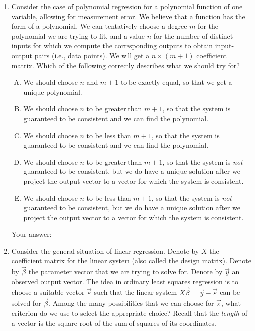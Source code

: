\documentclass[10pt]{amsart}
\begin{document}
\begin{enumerate}
\item Consider the case of polynomial regression for a polynomial
  function of one variable, allowing for measurement error. We believe
  that a function has the form of a polynomial. We can tentatively
  choose a degree $m$ for the polynomial we are trying to fit, and a
  value $n$ for the number of distinct inputs for which we compute the
  corresponding outputs to obtain input-output pairs (i.e., data
  points). We will get a $n \times (m + 1)$ coefficient matrix. Which
  of the following correctly describes what we should try for?

  \begin{enumerate}[(A)]
  \item We should choose $n$ and $m + 1$ to be exactly equal, so that
    we get a unique polynomial.
  \item We should choose $n$ to be greater than $m + 1$, so that the
    system is guaranteed to be consistent and we can find the
    polynomial.
  \item We should choose $n$ to be less than $m + 1$, so that the
    system is guaranteed to be consistent and we can find the polynomial.
  \item We should choose $n$ to be greater than $m + 1$, so that the
    system is {\em not} guaranteed to be consistent, but we do have a
    unique solution after we project the output vector to a vector for
    which the system is consistent.
  \item We should choose $n$ to be less than $m + 1$, so that the
    system is {\em not} guaranteed to be consistent, but we do have a
    unique solution after we project the output vector to a vector for
    which the system is consistent.
  \end{enumerate}

  \vspace{0.1in}
  Your answer: $\underline{\qquad\qquad\qquad\qquad\qquad\qquad\qquad}$
  \vspace{0.1in}

\item Consider the general situation of linear regression. Denote by
  $X$ the coefficient matrix for the linear system (also called the
  design matrix). Denote by $\vec{\beta}$ the parameter vector that we
  are trying to solve for. Denote by $\vec{y}$ an observed output
  vector. The idea in ordinary least squares regression is to choose a
  suitable vector $\vec{\varepsilon}$ such that the linear system
  $X\vec{\beta} = \vec{y} - \vec{\varepsilon}$ can be solved for
  $\vec{\beta}$. Among the many possibilities that we can choose for
  $\vec{\varepsilon}$, what criterion do we use to select the
  appropriate choice? Recall that the {\em length} of a vector is the
  square root of the sum of squares of its coordinates.


\end{enumerate}
\end{document}
